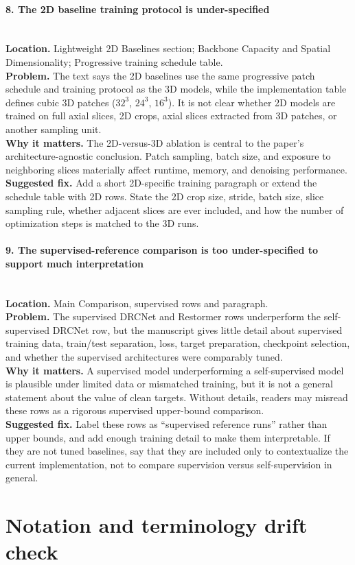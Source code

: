 \documentclass[11pt]{article}
\newcommand{\findingtitle}[1]{\paragraph{#1}\mbox{}\\}
\newcommand{\loc}[1]{\textbf{Location.} #1\\}
\newcommand{\problem}[1]{\textbf{Problem.} #1\\}
\newcommand{\why}[1]{\textbf{Why it matters.} #1\\}
\newcommand{\fix}[1]{\textbf{Suggested fix.} #1\par}
\begin{document}
\findingtitle{8. The 2D baseline training protocol is under-specified}
\loc{Lightweight 2D Baselines section; Backbone Capacity and Spatial Dimensionality; Progressive training schedule table.}
\problem{The text says the 2D baselines use the same progressive patch schedule and training protocol as the 3D models, while the implementation table defines cubic 3D patches ($32^3$, $24^3$, $16^3$). It is not clear whether 2D models are trained on full axial slices, 2D crops, axial slices extracted from 3D patches, or another sampling unit.}
\why{The 2D-versus-3D ablation is central to the paper's architecture-agnostic conclusion. Patch sampling, batch size, and exposure to neighboring slices materially affect runtime, memory, and denoising performance.}
\fix{Add a short 2D-specific training paragraph or extend the schedule table with 2D rows. State the 2D crop size, stride, batch size, slice sampling rule, whether adjacent slices are ever included, and how the number of optimization steps is matched to the 3D runs.}

\findingtitle{9. The supervised-reference comparison is too under-specified to support much interpretation}
\loc{Main Comparison, supervised rows and paragraph.}
\problem{The supervised DRCNet and Restormer rows underperform the self-supervised DRCNet row, but the manuscript gives little detail about supervised training data, train/test separation, loss, target preparation, checkpoint selection, and whether the supervised architectures were comparably tuned.}
\why{A supervised model underperforming a self-supervised model is plausible under limited data or mismatched training, but it is not a general statement about the value of clean targets. Without details, readers may misread these rows as a rigorous supervised upper-bound comparison.}
\fix{Label these rows as ``supervised reference runs'' rather than upper bounds, and add enough training detail to make them interpretable. If they are not tuned baselines, say that they are included only to contextualize the current implementation, not to compare supervision versus self-supervision in general.}

\section*{Notation and terminology drift check}
\end{document}
